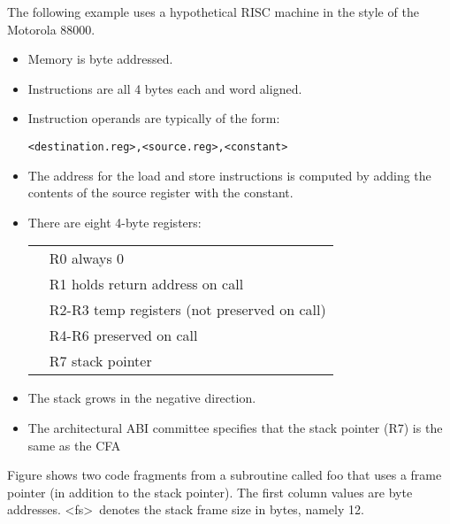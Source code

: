 The following example uses a hypothetical RISC machine in
the style of the Motorola 88000.
\begin{itemize}
\item Memory is byte addressed.

\item Instructions are all 4 bytes each and word aligned.

\item Instruction operands are typically of the form:
\begin{alltt}
    <destination.reg>, <source.reg>, <constant>
\end{alltt}

\item The address for the load and store instructions is computed
by adding the contents of the
source register with the constant.

\item There are eight 4-byte registers:
\newline
\begin{tabular}{p{5mm}l}
   & R0 always 0 \\
   & R1 holds return address on call \\
   & R2-R3 temp registers (not preserved on call) \\
   & R4-R6 preserved on call \\
   & R7 stack pointer \\
\end{tabular}

\item  The stack grows in the negative direction.

\item The architectural ABI committee specifies that the
stack pointer (R7) is the same as the CFA

\end{itemize}

Figure 
shows two code fragments from a subroutine called
foo that uses a frame pointer (in addition to the stack
pointer). The first column values are byte addresses. 
\textless fs\textgreater\ denotes the stack frame size in bytes, namely 12.


